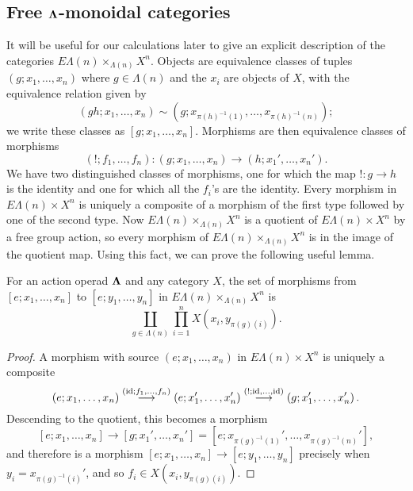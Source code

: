 


\subsection{Free $\mathbf{\Lambda}$-monoidal categories}


It will be useful for our calculations later to give an explicit description of the categories $E\Lambda(n) \times_{\Lambda(n)} X^{n}$. Objects are equivalence classes of tuples $(g; x_1, \ldots, x_n)$ where $g \in \Lambda(n)$ and the $x_{i}$ are objects of $X$, with the equivalence relation given by
  \[
    (gh; x_1, \ldots, x_n) \sim \left(g; x_{\pi(h)^{-1}(1)}, \ldots, x_{\pi(h)^{-1}(n)}\right);
  \]
  we write these classes as $[g; x_1, \ldots, x_n]$. Morphisms are then equivalence classes of morphisms
  \[
    (!; f_1, \ldots, f_n) \colon  (g; x_1, \ldots, x_n) \rightarrow \left(h; x_1', \ldots, x_n'\right).
  \]
We have two distinguished classes of morphisms, one for which the map $! \colon  g \rightarrow h$ is the identity and one for which all the $f_{i}$'s are the identity. Every morphism in $E\Lambda(n) \times X^{n}$ is uniquely a composite of a  morphism of the first type followed by one of the second type. Now $E\Lambda(n) \times_{\Lambda(n)} X^{n}$ is a quotient of $E\Lambda(n) \times X^{n}$ by a free group action, so every morphism of $E\Lambda(n) \times_{\Lambda(n)} X^{n}$ is in the image of the quotient map. Using this fact, we can prove the following useful lemma.

\begin{lem}\label{hom-set-lemma}
For an action operad $\mathbf{\Lambda}$ and any category $X$, the set of morphisms from $[e; x_1, \ldots, x_n]$ to $[e; y_1, \ldots, y_n]$ in $E\Lambda(n) \times_{\Lambda(n)} X^{n}$ is
  \[
    \coprod_{g \in \Lambda(n)} \prod_{i=1}^{n} X\left(x_i, y_{\pi(g)(i)}\right).
  \]
\end{lem}
\begin{proof}
A morphism with source $(e; x_1, \ldots, x_n)$ in $E\Lambda(n) \times X^{n}$ is uniquely a composite
  \[
    (e; x_1, \ldots, x_n) \stackrel{(\textrm{id}; f_{1}, \ldots, f_{n})}{\longrightarrow} \left(e; x_1', \ldots, x_n'\right) \stackrel{(!; \textrm{id}, \ldots, \textrm{id})}{\longrightarrow} \left(g; x_1', \ldots, x_n'\right).
  \]
Descending to the quotient, this becomes a morphism
  \[
    [e; x_1, \ldots, x_n] \rightarrow \left[g; x_1', \ldots, x_n'\right] = \left[e; x_{\pi(g)^{-1}(1)}', \ldots, x_{\pi(g)^{-1}(n)}'\right],
  \]
and therefore is a morphism $[e; x_1, \ldots, x_n] \rightarrow [e; y_1, \ldots, y_n]$ precisely when $y_i = x_{\pi(g)^{-1}(i)}'$, and so $f_i \in   X(x_i, y_{\pi(g)(i)})$.
\end{proof}

